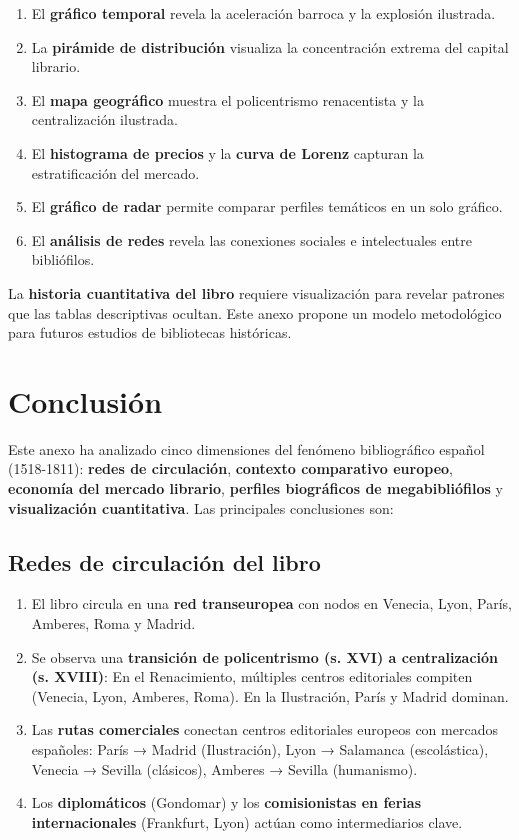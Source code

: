 \documentclass[11pt,a4paper]{article}
\begin{document}
\begin{enumerate}
\item El \textbf{gráfico temporal} revela la aceleración barroca y la explosión ilustrada.
\item La \textbf{pirámide de distribución} visualiza la concentración extrema del capital librario.
\item El \textbf{mapa geográfico} muestra el policentrismo renacentista y la centralización ilustrada.
\item El \textbf{histograma de precios} y la \textbf{curva de Lorenz} capturan la estratificación del mercado.
\item El \textbf{gráfico de radar} permite comparar perfiles temáticos en un solo gráfico.
\item El \textbf{análisis de redes} revela las conexiones sociales e intelectuales entre bibliófilos.
\end{enumerate}

La \textbf{historia cuantitativa del libro} requiere visualización para revelar patrones que las tablas descriptivas ocultan. Este anexo propone un modelo metodológico para futuros estudios de bibliotecas históricas.

\section{Conclusión}

Este anexo ha analizado cinco dimensiones del fenómeno bibliográfico español (1518-1811): \textbf{redes de circulación}, \textbf{contexto comparativo europeo}, \textbf{economía del mercado librario}, \textbf{perfiles biográficos de megabibliófilos} y \textbf{visualización cuantitativa}. Las principales conclusiones son:

\subsection{Redes de circulación del libro}

\begin{enumerate}
\item El libro circula en una \textbf{red transeuropea} con nodos en Venecia, Lyon, París, Amberes, Roma y Madrid.

\item Se observa una \textbf{transición de policentrismo (s. XVI) a centralización (s. XVIII)}: En el Renacimiento, múltiples centros editoriales compiten (Venecia, Lyon, Amberes, Roma). En la Ilustración, París y Madrid dominan.

\item Las \textbf{rutas comerciales} conectan centros editoriales europeos con mercados españoles: París → Madrid (Ilustración), Lyon → Salamanca (escolástica), Venecia → Sevilla (clásicos), Amberes → Sevilla (humanismo).

\item Los \textbf{diplomáticos} (Gondomar) y los \textbf{comisionistas en ferias internacionales} (Frankfurt, Lyon) actúan como intermediarios clave.
\end{enumerate}
\end{document}
